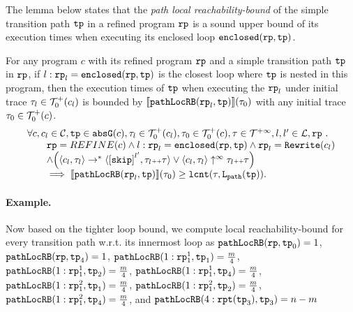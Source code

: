 The lemma below states that the \emph{path local reachability-bound} of the simple transition path $\mathtt{tp}$ in a refined program $\mathtt{rp}$ is a sound upper bound of its execution times when executing its enclosed loop $\mathtt{enclosed}(\mathtt{rp}, \mathtt{tp})$.
\begin{lem}
  \label{lem:pathlocalrb-sound}
  For any program $c$ with its refined program $\mathtt{rp}$ and a simple transition path $\mathtt{tp}$ in $\mathtt{rp}$,
  if $l: \mathtt{rp}_l = \mathtt{enclosed}(\mathtt{rp}, \mathtt{tp})$ is the closest loop where $\mathtt{tp}$ is nested in this program,
  then the execution times of $\mathtt{tp}$ when executing the $\mathtt{rp}_l$ under initial trace $\mathtt{\tau}_l \in \mathcal{T}^{+}_0(c_l)$ is bounded by $\llbracket \mathtt{pathLocRB}(\mathtt{rp}_l, \mathtt{tp}) \rrbracket(\mathtt{\tau}_0)$ with any initial trace $\mathtt{\tau}_0 \in \mathcal{T}^{+}_0(c)$.
  \[
    \begin{array}{l}
    \forall c, c_l \in \cdom, \tpath \in \absG(c), 
    \trace_l \in \ftdom_0(c_l), \trace_0 \in \ftdom_0(c), \trace \in \tdom, l, l' \in \ldom, \rprog \st 
    \\ \qquad
    \rprog = REFINE(c)
    \land
    l: \rprog_l = \kw{enclosed}(\rprog, \tpath)
    \land 
    \rprog_l = \algrewrite(c_l)
    \\ \qquad
    \land
    \Big(
    \config{c_l, \trace_l} \rightarrow^* \config{\clabel{\eskip}^{l'}, \trace_l \tracecat \trace}
    \lor \config{c_l, \trace_l} \uparrow^{\infty} \trace_l \tracecat \trace 
    \Big)
    \\ \qquad
    \implies
    \econfig{\outinB(\rprog_l, \tpath)}(\trace_0) \geq \lcounter(\trace, \pathl(\tpath)).
    \end{array}
  \]  
\end{lem}


\paragraph{Example.}
Now based on the tighter loop bound,
we compute local reachability-bound for every transition path w.r.t. its innermost loop as
$\mathtt{pathLocRB}(\mathtt{rp}, \mathtt{tp}_0) = 1$,
$\mathtt{pathLocRB}(\mathtt{rp}, \mathtt{tp}_4) = 1$,
$\mathtt{pathLocRB}(1: \mathtt{rp}_1^1, \mathtt{tp}_1) = \frac{m}{4}$,
$\mathtt{pathLocRB}(1: \mathtt{rp}_1^1, \mathtt{tp}_2) = \frac{m}{4}$,
$\mathtt{pathLocRB}(1: \mathtt{rp}_1^1, \mathtt{tp}_4) = \frac{m}{4}$,
$\mathtt{pathLocRB}(1: \mathtt{rp}_1^2, \mathtt{tp}_1) = \frac{m}{4}$,
$\mathtt{pathLocRB}(1: \mathtt{rp}_1^2, \mathtt{tp}_2) = \frac{m}{4}$,
$\mathtt{pathLocRB}(1: \mathtt{rp}_1^2, \mathtt{tp}_4) = \frac{m}{4}$, and
$\mathtt{pathLocRB}(4: \mathtt{rpt}(\mathtt{tp}_3), \mathtt{tp}_3) = n - m$ 

